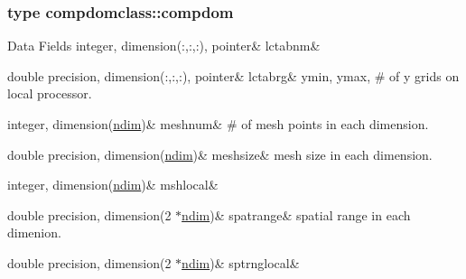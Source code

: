 \subsubsection{type compdomclass\+::compdom}
\begin{DoxyFields}{Data Fields}
\mbox{\label{namespacecompdomclass_aebcef97b10bb06dc69848b22acaffe70}} 
integer, dimension(:,:,:), pointer&
lctabnm&
\\
\hline

\mbox{\label{namespacecompdomclass_a339ff58ad4edb52e01cf217b9a7f081c}} 
double precision, dimension(:,:,:), pointer&
lctabrg&
ymin, ymax, \# of y grids on local processor. \\
\hline

\mbox{\label{namespacecompdomclass_a80b917ff817964bc120175119768f93e}} 
integer, dimension(\mbox{\hyperlink{namespacecompdomclass_a01f031d8af670f66db4484cd6411e99f}{ndim}})&
meshnum&
\# of mesh points in each dimension. \\
\hline

\mbox{\label{namespacecompdomclass_a13c6277e9ca60fa6a80081b2a0bc91ff}} 
double precision, dimension(\mbox{\hyperlink{namespacecompdomclass_a01f031d8af670f66db4484cd6411e99f}{ndim}})&
meshsize&
mesh size in each dimension. \\
\hline

\mbox{\label{namespacecompdomclass_a21d05738eabd33f56f26879055af6343}} 
integer, dimension(\mbox{\hyperlink{namespacecompdomclass_a01f031d8af670f66db4484cd6411e99f}{ndim}})&
mshlocal&
\\
\hline

\mbox{\label{namespacecompdomclass_a55068267999d67699122c91b366a0682}} 
double precision, dimension(2 $\ast$\mbox{\hyperlink{namespacecompdomclass_a01f031d8af670f66db4484cd6411e99f}{ndim}})&
spatrange&
spatial range in each dimenion. \\
\hline

\mbox{\label{namespacecompdomclass_a2a2654ff7dd41dbb57b11a089e568123}} 
double precision, dimension(2 $\ast$\mbox{\hyperlink{namespacecompdomclass_a01f031d8af670f66db4484cd6411e99f}{ndim}})&
sptrnglocal&
\\
\hline

\end{DoxyFields}
